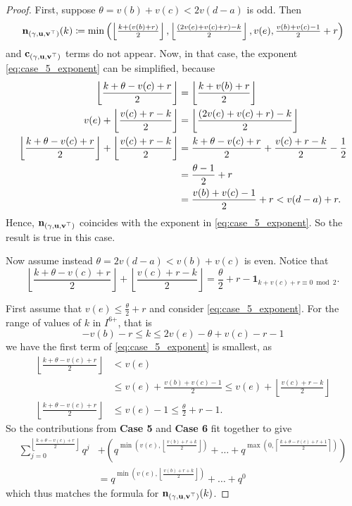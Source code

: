 \begin{proof}
  First, suppose $\theta = v(b) + v(c) < 2v(d-a)$ is odd.
  Then
  \[ \mathbf n_{(\gamma, \mathbf u, \mathbf v^\top)}(k) \coloneqq \min\left( \left\lfloor \tfrac{k + (v(b)+r)}{2} \right\rfloor,
      \left\lfloor \tfrac{(2v(e)+v(c)+r)-k}{2} \right\rfloor,
      v(e), \tfrac{v(b)+v(c)-1}{2} + r \right) \]
  and $\mathbf c_{(\gamma, \mathbf u, \mathbf v^\top)}$ terms do not appear.
  Now, in that case, the exponent \eqref{eq:case_5_exponent} can be simplified, because
  \begin{align*}
    \left\lfloor \frac{k+\theta-v(c)+r}{2} \right\rfloor
    &= \left\lfloor \frac{k+v(b)+r}{2} \right\rfloor \\
    v(e) + \left\lfloor \frac{v(c)+r-k}{2} \right\rfloor
    &= \left\lfloor \frac{(2v(e) + v(c) + r) - k}{2} \right\rfloor \\
    \left\lfloor \frac{k+\theta-v(c)+r}{2} \right\rfloor
    + \left\lfloor \frac{v(c)+r-k}{2} \right\rfloor
    &= \frac{k+\theta-v(c)+r}{2} + \frac{v(c)+r-k}{2} - \frac{1}{2} \\
    &= \frac{\theta-1}{2} + r \\
    &= \frac{v(b)+v(c)-1}{2} + r < v(d-a) + r.
  \end{align*}
  Hence, $\mathbf n_{(\gamma, \mathbf u, \mathbf v^\top)}$ coincides with the exponent in \eqref{eq:case_5_exponent}.
  So the result is true in this case.

  Now assume instead $\theta = 2v(d-a) < v(b) + v(c)$ is even.
  Notice that
  \[ \left\lfloor \frac{k+\theta-v(c)+r}{2} \right\rfloor
    + \left\lfloor \frac{v(c)+r-k}{2} \right\rfloor
    = \frac{\theta}{2} + r - \mathbf{1}_{k + v(c) + r \equiv 0 \bmod 2}. \]

  First assume that $v(e) \le \frac{\theta}{2} + r$ and
  consider \eqref{eq:case_5_exponent}.
  For the range of values of $k$ in $I^{\text{6+}}$, that is
  \[ -v(b) - r \le k \le 2v(e)-\theta+v(c)-r-1 \]
  we have the first term of \eqref{eq:case_5_exponent} is smallest, as
  \begin{align*}
    \left\lfloor \frac{k + \theta - v(c) + r}{2} \right\rfloor &< v(e) \\
    &\le v(e) + \frac{v(b)+v(c)-1}{2}
      \le v(e) + \left\lfloor \frac{v(c)+r-k}{2} \right\rfloor \\
    \left\lfloor \frac{k + \theta - v(c) + r}{2} \right\rfloor &\le v(e)-1
      \le \frac{\theta}{2} + r -1.
  \end{align*}
  So the contributions from \textbf{Case 5} and \textbf{Case 6}
  fit together to give
  \begin{align*}
    \sum_{j=0}^{\left\lfloor \frac{k+\theta-v(c)+r}{2} \right\rfloor} q^j
    &+
    \left(
    q^{\min\left( v(e), \left\lfloor \frac{v(b) + r + k}{2} \right\rfloor \right)}
    + \dots
    + q^{\max\left(0, \left\lceil \frac{k + \theta - v(c) + r + 1}{2} \right\rceil \right)}
    \right) \\
    &=
    q^{\min(v(e), \left\lfloor \frac{v(b) + r + k}{2} \right\rfloor)} + \dots + q^0
  \end{align*}
  which thus matches the formula for $\mathbf n_{(\gamma, \mathbf u, \mathbf v^\top)}(k)$.


\end{proof}
